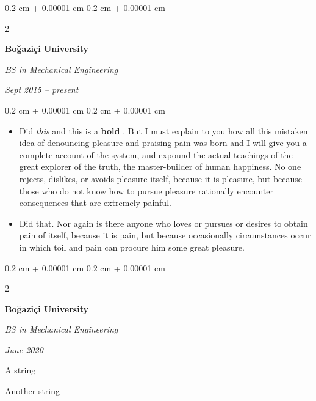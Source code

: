 \documentclass[10pt, letterpaper]{article}
\newenvironment{summary}{
    \begin{description}[
        topsep=0.10 cm,
        parsep=0.10 cm,
        partopsep=0pt,
        itemsep=0pt,
        leftmargin=0.4 cm + 10pt
    ]
}{
    \end{description}
} %
\newenvironment{highlights}{
    \begin{itemize}[
        topsep=0.10 cm,
        parsep=0.10 cm,
        partopsep=0pt,
        itemsep=0pt,
        leftmargin=0.4 cm + 10pt
    ]
}{
    \end{itemize}
} %
\newenvironment{onecolentry}{
    \begin{adjustwidth}{
        0.2 cm + 0.00001 cm
    }{
        0.2 cm + 0.00001 cm
    }
}{
    \end{adjustwidth}
} %
\newenvironment{twocolentry}[2][]{
    \onecolentry
    \def\secondColumn{#2}
    \setcolumnwidth{\fill, 4.5 cm}
    \begin{paracol}{2}
}{
    \switchcolumn \raggedleft \secondColumn
    \end{paracol}
    \endonecolentry
} %
\let\hrefWithoutArrow\href
\renewcommand{\href}[2]{\hrefWithoutArrow{#1}{\ifthenelse{\equal{#2}{}}{ }{#2 }\raisebox{.15ex}{\footnotesize \faExternalLink*}}}
\begin{document}
        \vspace{0.2 cm}

        \begin{twocolentry}{
            
            
        \textit{Sept 2015 – present}}
            \textbf{Boğaziçi University}

            \textit{BS in Mechanical Engineering}
        \end{twocolentry}
        \vspace{0.10 cm}
        \begin{onecolentry}
            \begin{highlights}
                \item Did \textit{this} and this is a \textbf{bold} \href{https://example.com}{link}. But I must explain to you how all this mistaken idea of denouncing pleasure and praising pain was born and I will give you a complete account of the system, and expound the actual teachings of the great explorer of the truth, the master-builder of human happiness. No one rejects, dislikes, or avoids pleasure itself, because it is pleasure, but because those who do not know how to pursue pleasure rationally encounter consequences that are extremely painful.
                \item Did that. Nor again is there anyone who loves or pursues or desires to obtain pain of itself, because it is pain, but because occasionally circumstances occur in which toil and pain can procure him some great pleasure.
            \end{highlights}
        \end{onecolentry}


        \vspace{0.2 cm}

        \begin{twocolentry}{
            
            
        \textit{June 2020}}
            \textbf{Boğaziçi University}

            \textit{BS in Mechanical Engineering}
        \end{twocolentry}
            \begin{summary}
                \item A string
                \item Another string
            \end{summary}


        \vspace{0.2 cm}
\end{document}
